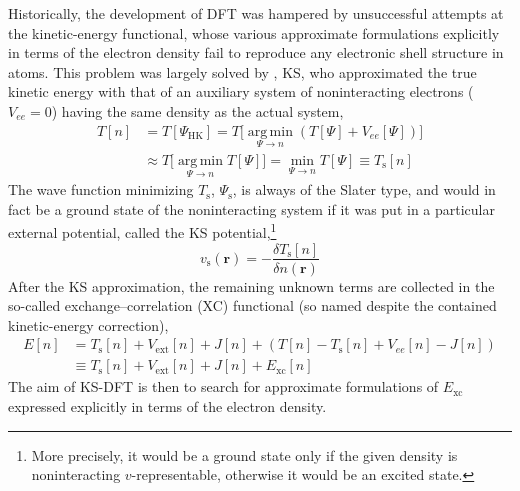 Historically, the development of DFT was hampered by unsuccessful attempts at the kinetic-energy functional, whose various approximate formulations explicitly in terms of the electron density fail to reproduce any electronic shell structure in atoms.
This problem was largely solved by \citet{KohnPR65}, KS, who approximated the true kinetic energy with that of an auxiliary system of noninteracting electrons ($V_{ee}=0$) having the same density as the actual system,
\begin{equation}
\begin{aligned}
  T[n]&=T[\Psi_\text{HK}]=T\big[\operatorname*{arg\,min}_{\Psi\rightarrow n}(T[\Psi]+V_{ee}[\Psi])\big] \\
  &\approx T\big[\operatorname*{arg\,min}_{\Psi\rightarrow n}T[\Psi]\big]=\min_{\Psi\rightarrow n}T[\Psi]\equiv T_\text{s}[n]
\end{aligned}
\label{eq:ks-kinetic}
\end{equation}
The wave function minimizing $T_\text{s}$, $\Psi_\text{s}$, is always of the Slater type, and would in fact be a ground state of the noninteracting system if it was put in a particular external potential, called the KS potential,\footnote{
More precisely, it would be a ground state only if the given density is noninteracting $v$-representable, otherwise it would be an excited state.
}
\begin{equation}
  v_\text{s}(\mathbf r)=-\frac{\delta T_\text{s}[n]}{\delta n(\mathbf r)}
\end{equation}
After the KS approximation, the remaining unknown terms are collected in the so-called exchange--correlation (XC) functional (so named despite the contained kinetic-energy correction),
\begin{equation}
\begin{aligned}
  E[n]&=T_\text{s}[n]+V_\text{ext}[n]+J[n]+(T[n]-T_\text{s}[n]+V_{ee}[n]-J[n]) \\
  &\equiv T_\text{s}[n]+V_\text{ext}[n]+J[n]+E_\text{xc}[n]
  \label{eq:ks-dft-energy}
\end{aligned}
\end{equation}
The aim of KS-DFT is then to search for approximate formulations of $E_\text{xc}$ expressed explicitly in terms of the electron density.

